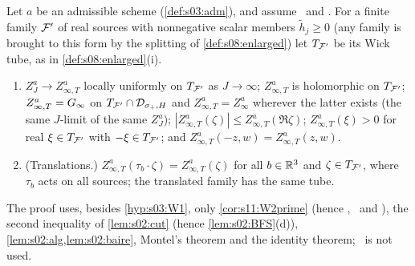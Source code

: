 \begin{proposition}\label{prop:s08:T}
Let $a$ be an admissible scheme (\cref{def:s03:adm}), and assume \Itwo\ and \Ithree. For a finite family $\mathcal F'$ of real sources with nonnegative scalar members $\tilde h_j\ge0$ (any family is brought to this form by the splitting of \cref{def:s08:enlarged}) let $T_{\mathcal F'}$ be its Wick tube, as in \cref{def:s08:enlarged}(i).
\begin{enumerate}[label=\textup{(\alph*)},leftmargin=*,nosep]
\item $Z^a_J\to Z^a_{\infty,T}$ locally uniformly on $T_{\mathcal F'}$ as $J\to\infty$; $Z^a_{\infty,T}$ is holomorphic on $T_{\mathcal F'}$; $Z^a_{\infty,T}=G_\infty$ on $T_{\mathcal F'}\cap\mathcal D_{\sigma_+,H}$ and $Z^a_{\infty,T}=Z^a_\infty$ wherever the latter exists (the same $J$-limit of the same $Z^a_J$); $|Z^a_{\infty,T}(\zeta)|\le Z^a_{\infty,T}(\Re\zeta)$; $Z^a_{\infty,T}(\xi)>0$ for real $\xi\in T_{\mathcal F'}$ with $-\xi\in T_{\mathcal F'}$; and $Z^a_{\infty,T}(-z,w)=Z^a_{\infty,T}(z,w)$.
\item \textup{(Translations.)} $Z^a_{\infty,T}(\tau_b\cdot\zeta)=Z^a_{\infty,T}(\zeta)$ for all $b\in\mathbb R^3$ and $\zeta\in T_{\mathcal F'}$, where $\tau_b$ acts on all sources; the translated family has the same tube.
\end{enumerate}
The proof uses, besides \cref{hyp:s03:W1}, only \cref{cor:s11:W2prime} (hence \Itwo, \Ithree\ and \cite[Thm.~6.2(1),(2)]{BFS1}), the second inequality of \cref{lem:s02:cut} (hence \cref{lem:s02:BFS}(d)), \cref{lem:s02:alg,lem:s02:baire}, Montel's theorem and the identity theorem; \Wtwo\ is not used.
\end{proposition}

